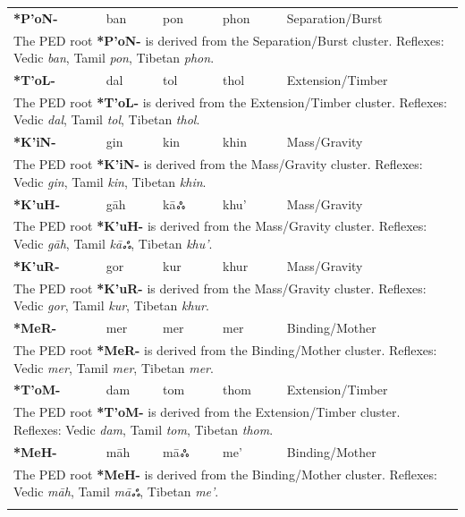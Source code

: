 \begin{longtable}{p{} p{} p{} p{} p{}}
\textbf{*P'oN-} & ban & pon & phon & Separation/Burst \\ 
\multicolumn{5}{p{\textwidth}}{\small The PED root \textbf{*P'oN-} is derived from the Separation/Burst cluster. Reflexes: Vedic \textit{ban}, Tamil \textit{pon}, Tibetan \textit{phon}. } \\ \addlinespace 
\textbf{*T'oL-} & dal & tol & thol & Extension/Timber \\ 
\multicolumn{5}{p{\textwidth}}{\small The PED root \textbf{*T'oL-} is derived from the Extension/Timber cluster. Reflexes: Vedic \textit{dal}, Tamil \textit{tol}, Tibetan \textit{thol}. } \\ \addlinespace 
\textbf{*K'iN-} & gin & kin & khin & Mass/Gravity \\ 
\multicolumn{5}{p{\textwidth}}{\small The PED root \textbf{*K'iN-} is derived from the Mass/Gravity cluster. Reflexes: Vedic \textit{gin}, Tamil \textit{kin}, Tibetan \textit{khin}. } \\ \addlinespace 
\textbf{*K'uH-} & gāh & kāஃ & khu' & Mass/Gravity \\ 
\multicolumn{5}{p{\textwidth}}{\small The PED root \textbf{*K'uH-} is derived from the Mass/Gravity cluster. Reflexes: Vedic \textit{gāh}, Tamil \textit{kāஃ}, Tibetan \textit{khu'}. } \\ \addlinespace 
\textbf{*K'uR-} & gor & kur & khur & Mass/Gravity \\ 
\multicolumn{5}{p{\textwidth}}{\small The PED root \textbf{*K'uR-} is derived from the Mass/Gravity cluster. Reflexes: Vedic \textit{gor}, Tamil \textit{kur}, Tibetan \textit{khur}. } \\ \addlinespace 
\textbf{*MeR-} & mer & mer & mer & Binding/Mother \\ 
\multicolumn{5}{p{\textwidth}}{\small The PED root \textbf{*MeR-} is derived from the Binding/Mother cluster. Reflexes: Vedic \textit{mer}, Tamil \textit{mer}, Tibetan \textit{mer}. } \\ \addlinespace 
\textbf{*T'oM-} & dam & tom & thom & Extension/Timber \\ 
\multicolumn{5}{p{\textwidth}}{\small The PED root \textbf{*T'oM-} is derived from the Extension/Timber cluster. Reflexes: Vedic \textit{dam}, Tamil \textit{tom}, Tibetan \textit{thom}. } \\ \addlinespace 
\textbf{*MeH-} & māh & māஃ & me' & Binding/Mother \\ 
\multicolumn{5}{p{\textwidth}}{\small The PED root \textbf{*MeH-} is derived from the Binding/Mother cluster. Reflexes: Vedic \textit{māh}, Tamil \textit{māஃ}, Tibetan \textit{me'}. } \\ \addlinespace 

\end{longtable}
